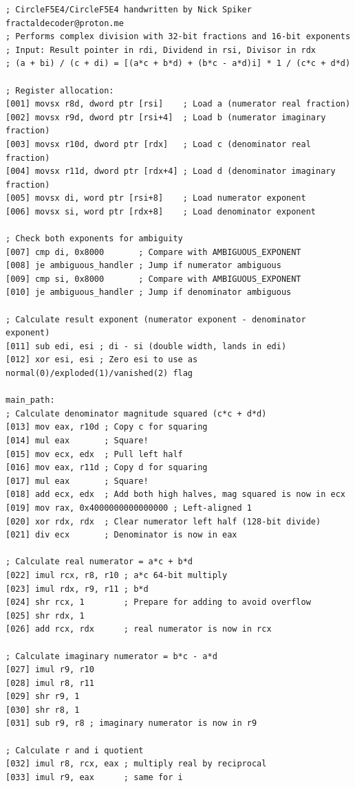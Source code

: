 \documentclass[12pt,letter]{article}
\begin{document}
\begin{lstlisting}[style=rust, caption={Complete Complex Division Assembly Implementation}, label={fig:circle_divide}]
; CircleF5E4/CircleF5E4 handwritten by Nick Spiker fractaldecoder@proton.me
; Performs complex division with 32-bit fractions and 16-bit exponents
; Input: Result pointer in rdi, Dividend in rsi, Divisor in rdx
; (a + bi) / (c + di) = [(a*c + b*d) + (b*c - a*d)i] * 1 / (c*c + d*d)

; Register allocation:
[001] movsx r8d, dword ptr [rsi]    ; Load a (numerator real fraction)
[002] movsx r9d, dword ptr [rsi+4]  ; Load b (numerator imaginary fraction)
[003] movsx r10d, dword ptr [rdx]   ; Load c (denominator real fraction)
[004] movsx r11d, dword ptr [rdx+4] ; Load d (denominator imaginary fraction)
[005] movsx di, word ptr [rsi+8]    ; Load numerator exponent
[006] movsx si, word ptr [rdx+8]    ; Load denominator exponent

; Check both exponents for ambiguity
[007] cmp di, 0x8000       ; Compare with AMBIGUOUS_EXPONENT
[008] je ambiguous_handler ; Jump if numerator ambiguous
[009] cmp si, 0x8000       ; Compare with AMBIGUOUS_EXPONENT
[010] je ambiguous_handler ; Jump if denominator ambiguous

; Calculate result exponent (numerator exponent - denominator exponent)
[011] sub edi, esi ; di - si (double width, lands in edi)
[012] xor esi, esi ; Zero esi to use as normal(0)/exploded(1)/vanished(2) flag

main_path:
; Calculate denominator magnitude squared (c*c + d*d)
[013] mov eax, r10d ; Copy c for squaring
[014] mul eax       ; Square!
[015] mov ecx, edx  ; Pull left half
[016] mov eax, r11d ; Copy d for squaring
[017] mul eax       ; Square!
[018] add ecx, edx  ; Add both high halves, mag squared is now in ecx
[019] mov rax, 0x4000000000000000 ; Left-aligned 1
[020] xor rdx, rdx  ; Clear numerator left half (128-bit divide)
[021] div ecx       ; Denominator is now in eax

; Calculate real numerator = a*c + b*d
[022] imul rcx, r8, r10 ; a*c 64-bit multiply
[023] imul rdx, r9, r11 ; b*d
[024] shr rcx, 1        ; Prepare for adding to avoid overflow
[025] shr rdx, 1
[026] add rcx, rdx      ; real numerator is now in rcx

; Calculate imaginary numerator = b*c - a*d
[027] imul r9, r10
[028] imul r8, r11
[029] shr r9, 1
[030] shr r8, 1
[031] sub r9, r8 ; imaginary numerator is now in r9

; Calculate r and i quotient
[032] imul r8, rcx, eax ; multiply real by reciprocal
[033] imul r9, eax      ; same for i


\end{lstlisting}
\end{document}
